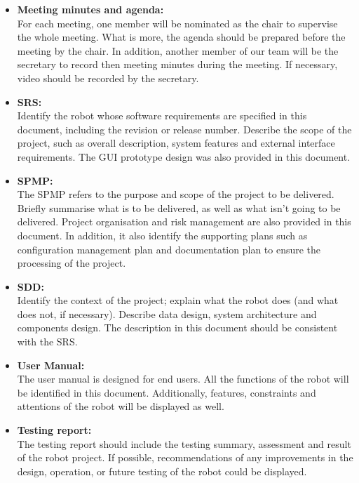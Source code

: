 \documentclass[11pt, a4paper]{article}
\begin{document}
\begin{itemize}
\item {\bfseries Meeting minutes and agenda:} \\
For each meeting, one member will be nominated as the chair to supervise the whole meeting. What is more, the agenda should be prepared before the meeting by the chair. In addition, another member of our team will be the secretary to record then meeting minutes during the meeting. If necessary, video should be recorded by the secretary.\\

\item {\bfseries SRS:} \\
Identify the robot whose software requirements are specified in this document, including the revision or release number. Describe the scope of the project, such as overall description, system features and external interface requirements. The GUI prototype design was also provided in this document.\\

\item {\bfseries SPMP:} \\
The SPMP refers to the purpose and scope of the project to be delivered. Briefly summarise what is to be delivered, as well as what isn't going to be delivered. Project organisation and risk management are also provided in this document. In addition, it also identify the supporting plans such as configuration management plan and documentation plan to ensure the processing of the project.\\

\item {\bfseries SDD:}\\
Identify the context of the project; explain what the robot does (and what does not, if necessary). Describe data design, system architecture and components design. The description in this document should be consistent with the SRS.\\

\item {\bfseries User Manual:}\\
The user manual is designed for end users. All the functions of the robot will be identified in this document. Additionally, features, constraints and attentions of the robot will be displayed as well.\\

\item {\bfseries Testing report:}\\
The testing report should include the testing summary, assessment and result of the robot project. If possible, recommendations of any improvements in the design, operation, or future testing of the robot could be displayed.\\
\end{itemize}
\newpage
\end{document}
